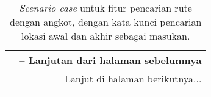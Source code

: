 \vspace{-0.25cm}
\begin{longtable}{| l | c p{10cm} |}
	\caption{\textit{Scenario case} untuk fitur pencarian rute dengan angkot, dengan kata kunci pencarian lokasi awal dan akhir sebagai masukan.}
    \label{tab:thesisapp-scenariocase-findroutedirect} \\
	
	\hline 
	\endfirsthead
	
	\multicolumn{3}{c}{\textbf{\tablename\ \thetable{}} -- Lanjutan dari halaman sebelumnya} \\
	\hline 
	\endhead
	
	\hline \multicolumn{3}{|r|}{{Lanjut di halaman berikutnya...}} \\ \hline
	\endfoot
	
	\hline
	\endlastfoot


\end{longtable}
